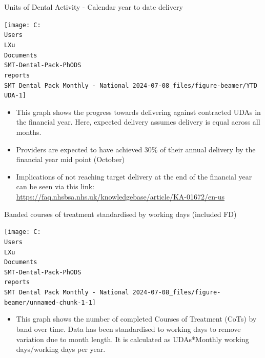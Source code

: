 \documentclass[
  8pt,
  ignorenonframetext,
  aspectratio = 169]{beamer}
\providecommand{\tightlist}{%
  \setlength{\itemsep}{0pt}\setlength{\parskip}{0pt}}
\begin{document}
\begin{frame}{Units of Dental Activity - Calendar year to date delivery}
\protect\hypertarget{units-of-dental-activity---calendar-year-to-date-delivery}{}
\begin{center}\texttt{[image: C:\\Users\\LXu\\Documents\\SMT-Dental-Pack-PhODS\\reports\\SMT Dental Pack Monthly - National 2024-07-08\_files/figure-beamer/YTD UDA-1]} \end{center}

\begin{itemize}
\tightlist
\item
  This graph shows the progress towards delivering against contracted
  UDAs in the financial year. Here, expected delivery assumes delivery
  is equal across all months.
\item
  Providers are expected to have achieved 30\% of their annual delivery
  by the financial year mid point (October)
\item
  Implications of not reaching target delivery at the end of the
  financial year can be seen via this link:
  \url{https://faq.nhsbsa.nhs.uk/knowledgebase/article/KA-01672/en-us}
\end{itemize}
\end{frame}

\begin{frame}{Banded courses of treatment standardised by working days
(included FD)}
\protect\hypertarget{banded-courses-of-treatment-standardised-by-working-days-included-fd}{}
\begin{center}\texttt{[image: C:\\Users\\LXu\\Documents\\SMT-Dental-Pack-PhODS\\reports\\SMT Dental Pack Monthly - National 2024-07-08\_files/figure-beamer/unnamed-chunk-1-1]} \end{center}

\begin{itemize}
\tightlist
\item
  This graph shows the number of completed Courses of Treatment (CoTs)
  by band over time. Data has been standardised to working days to
  remove variation due to month length. It is calculated as UDAs*Monthly
  working days/working days per year.
\end{itemize}
\end{frame}
\end{document}
